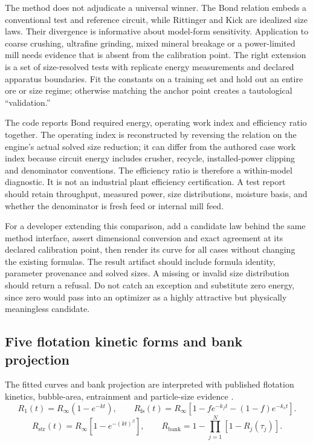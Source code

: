 \documentclass[10pt]{article}
\begin{document}
The method does not adjudicate a universal winner. The Bond relation
embeds a conventional test and reference circuit, while Rittinger and
Kick are idealized size laws. Their divergence is informative about
model-form sensitivity. Application to coarse crushing, ultrafine
grinding, mixed mineral breakage or a power-limited mill needs evidence
that is absent from the calibration point. The right extension is a set
of size-resolved tests with replicate energy measurements and declared
apparatus boundaries. Fit the constants on a training set and hold out
an entire ore or size regime; otherwise matching the anchor point
creates a tautological ``validation.''

The code reports Bond required energy, operating work index and
efficiency ratio together. The operating index is reconstructed by
reversing the relation on the engine's actual solved size reduction; it
can differ from the authored case work index because circuit energy
includes crusher, recycle, installed-power clipping and denominator
conventions. The efficiency ratio is therefore a within-model
diagnostic. It is not an industrial plant efficiency certification. A
test report should retain throughput, measured power, size
distributions, moisture basis, and whether the denominator is fresh feed
or internal mill feed.

For a developer extending this comparison, add a candidate law behind
the same method interface, assert dimensional conversion and exact
agreement at its declared calibration point, then render its curve for
all cases without changing the existing formulas. The result artifact
should include formula identity, parameter provenance and solved sizes.
A missing or invalid size distribution should return a refusal. Do not
catch an exception and substitute zero energy, since zero would pass
into an optimizer as a highly attractive but physically meaningless
candidate.

\subsection{Five flotation kinetic forms and bank
projection}\label{five-flotation-kinetic-forms-and-bank-projection}

\label{method-kinetics}

The fitted curves and bank projection are interpreted with published
flotation kinetics, bubble-area, entrainment and particle-size evidence
\cite{polat2000,vinnett2025,gorain1997,gorain1999,savassi1998,trahar1981}.
\begin{equation}
R_1(t)=R_\infty(1-e^{-kt}),
\qquad
R_{\mathrm{fs}}(t)=R_\infty[1-f e^{-k_f t}-(1-f)e^{-k_s t}].
\end{equation} \begin{equation}
R_{\mathrm{str}}(t)=R_\infty[1-e^{-(kt)^\beta}],
\qquad
R_{\mathrm{bank}}=1-\prod_{j=1}^{N}[1-R_j(\tau_j)].
\end{equation}
\end{document}
